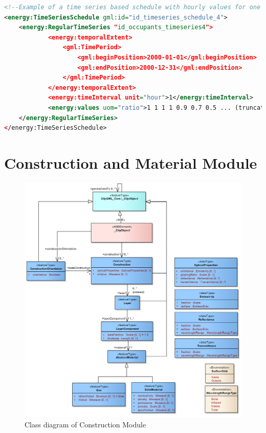 \documentclass[a4paper,12pt]{article}
\let\stdsection\section%
\renewcommand\section{\newpage\stdsection}
\begin{document}
\begin{lstlisting}[language=XML]
<!--Example of a time series based schedule with hourly values for one year-->
<energy:TimeSeriesSchedule gml:id="id_timeseries_schedule_4">
    <energy:RegularTimeSeries "id_occupants_timeseries4">
            <energy:temporalExtent>
                <gml:TimePeriod>
                    <gml:beginPosition>2000-01-01</gml:beginPosition>
                    <gml:endPosition>2000-12-31</gml:endPosition>
                </gml:TimePeriod>
            </energy:temporalExtent>
            <energy:timeInterval unit="hour">1</energy:timeInterval>
            <energy:values uom="ratio">1 1 1 1 0.9 0.7 0.5 ... (truncated, set of 8760 values)</energy:values>
    </energy:RegularTimeSeries>
</energy:TimeSeriesSchedule>
\end{lstlisting}

\section{Construction and Material
Module}\label{construction-and-material-module}

\begin{figure}[htbp]
\centering
\includegraphics{fig/class_construction.png}
\caption{Class diagram of Construction Module}
\end{figure}
\end{document}
